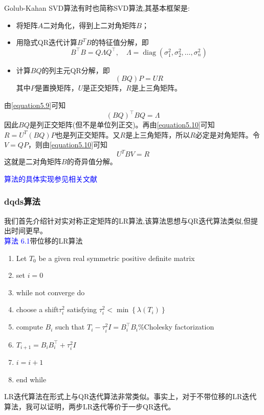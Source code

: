 \documentclass[12pt,a4paper]{article}
\begin{document}
Golub-Kahan SVD算法有时也简称SVD算法,其基本框架是:
\begin{itemize}
	\item 将矩阵$A$二对角化，得到上二对角矩阵$B$；
	\item 用隐式QR迭代计算$B^TB$的特征值分解，即
	\begin{equation}
	B^{\top} B=Q \Lambda Q^{\top}, \quad \Lambda=\operatorname{diag}\left(\sigma_{1}^{2}, \sigma_{2}^{2}, \ldots, \sigma_{n}^{2}\right)
	\label{equation5.9}
	\end{equation}
	\item 计算$BQ$的列主元QR分解，即\begin{equation}
	(B Q) P=U R
	\label{equation5.10}
	\end{equation}
	其中$P$是置换矩阵，$U$是正交矩阵，$R$是上三角矩阵。
\end{itemize}

由\ref{equation5.9}可知$$
(B Q)^{\top} B Q=\Lambda
$$
因此$BQ$是列正交矩阵(但不是单位列正交)。再由\ref{equation5.10}可知$R=U^T(BQ)P$也是列正交矩阵。又$R$是上三角矩阵，所以$R$必定是对角矩阵。令$V=QP$，则由\ref{equation5.10}可知$$U^TBV=R$$这就是二对角矩阵$B$的奇异值分解。

\textcolor{blue}{算法的具体实现参见相关文献}
\subsubsection{dqds算法}
我们首先介绍针对实对称正定矩阵的LR算法,该算法思想与QR迭代算法类似,但提出时间更早。\\
\textcolor{blue}{算法 6.1}\quad 带位移的LR算法
\begin{enumerate}[1:]
	\item Let $T_0$ be a given real symmetric positive definite matrix
	\item set $i=0$
	\item while not converge do 
	\item \quad choose a shift$\tau_{i}^{2}$ satisfying $\tau_{i}^{2}<\min \left\{\lambda\left(T_{i}\right)\right\}$
	\item \quad compute $B_i$ such that $T_{i}-\tau_{i}^{2} I=B_{i}^{\top} B_{i}$\qquad \%Cholesky factorization
	\item \quad $T_{i+1}=B_{i} B_{i}^{\top}+\tau_{i}^{2} I$
	\item \quad $i=i+1$
	\item end while
\end{enumerate}

LR迭代算法在形式上与QR迭代算法非常类似。事实上，对于不带位移的LR迭代算法，我可以证明，两步LR迭代等价于一步QR迭代。
\end{document}

